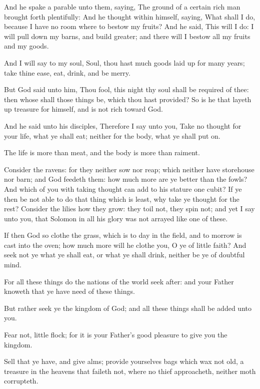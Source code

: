 \Verse And he spake a parable unto them, saying, The ground of a certain rich man brought forth plentifully: \Verse And he thought within himself, saying, What shall I do, because I have no room where to bestow my fruits?  \Verse And he said, This will I do: I will pull down my barns, and build greater; and there will I bestow all my fruits and my goods.

\Verse And I will say to my soul, Soul, thou hast much goods laid up for many years; take thine ease, eat, drink, and be merry.

\Verse But God said unto him, Thou fool, this night thy soul shall be required of thee: then whose shall those things be, which thou hast provided?  \Verse So is he that layeth up treasure for himself, and is not rich toward God.

\Verse And he said unto his disciples, Therefore I say unto you, Take no thought for your life, what ye shall eat; neither for the body, what ye shall put on.

\Verse The life is more than meat, and the body is more than raiment.

\Verse Consider the ravens: for they neither sow nor reap; which neither have storehouse nor barn; and God feedeth them: how much more are ye better than the fowls?  \Verse And which of you with taking thought can add to his stature one cubit?  \Verse If ye then be not able to do that thing which is least, why take ye thought for the rest?  \Verse Consider the lilies how they grow: they toil not, they spin not; and yet I say unto you, that Solomon in all his glory was not arrayed like one of these.

\Verse If then God so clothe the grass, which is to day in the field, and to morrow is cast into the oven; how much more will he clothe you, O ye of little faith?  \Verse And seek not ye what ye shall eat, or what ye shall drink, neither be ye of doubtful mind.

\Verse For all these things do the nations of the world seek after: and your Father knoweth that ye have need of these things.

\Verse But rather seek ye the kingdom of God; and all these things shall be added unto you.

\Verse Fear not, little flock; for it is your Father's good pleasure to give you the kingdom.

\Verse Sell that ye have, and give alms; provide yourselves bags which wax not old, a treasure in the heavens that faileth not, where no thief approacheth, neither moth corrupteth.

